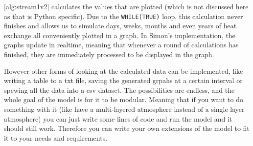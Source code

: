 \autoref{alg:stream1v2} calculates the values that are plotted (which is not discussed here as that is Python specific). Due to the \texttt{WHILE(TRUE)} loop, this calculation never finishes and
allows us to simulate days, weeks, months and even years of heat exchange all conveniently plotted in a graph. In Simon's implementation, the graphs update in realtime, meaning that whenever a 
round of calculations has finished, they are immediately processed to be displayed in the graph. 

However other forms of looking at the calculated data can be implemented, like writing a table to a txt file, saving the generated grpahs at a certain interval or spewing all the data into a csv 
dataset. The possibilities are endless, and the whole goal of the model is for it to be modular. Meaning that if you want to do something with it (like have a multi-layered atmosphere instead of 
a single layer atmosphere) you can just write some lines of code and run the model and it should still work. Therefore you can write your own extensions of the model to fit it to your needs and 
requirements.